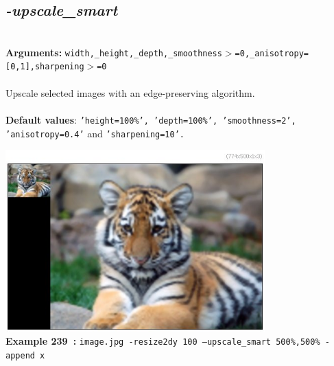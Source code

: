 \documentclass[a4paper,11pt,twoside]{book}
\begin{document}
\subsection{\emph{-upscale\_smart} }\vspace*{-0.5em}
~\\\textbf{Arguments: } 
{\small \texttt{width,\_height,\_depth,\_smoothness$>$=0,\_anisotropy=[0,1],sharpening$>$=0}}\\~\\
Upscale selected images with an edge-preserving algorithm.
~\\~\\\textbf{Default values}: {\small \texttt{'height=100\%', 'depth=100\%', 'smoothness=2', 'anisotropy=0.4'} and \texttt{'sharpening=10'.}}
\begin{center}\includegraphics[keepaspectratio=true,height=7cm,width=\textwidth]{img/gmic_def239.jpg}\\
{\footnotesize \textbf{Example 239~:} \texttt{image.jpg -resize2dy 100 --upscale\_smart 500\%,500\% -append x}}
\end{center}
\end{document}
